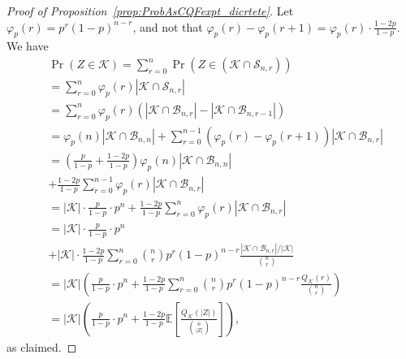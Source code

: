 \documentclass[article,doublecolumn]{IEEEtran}
\newcommand{\EE}{{\mathbb{E}}}
\newcommand{\BB}{{\mathcal{B}}}
\newcommand{\SSS}{{\mathcal{S}}}
\newcommand{\KK}{{\mathcal{K}}}
\begin{document}
\begin{proof}[Proof of Proposition~\ref{prop:ProbAsCQFexpt_dicrtete}]
Let $\varphi_p(r)=p^r(1-p)^{n-r}$, and not that $\varphi_p(r)-\varphi_{p}(r+1)=\varphi_p(r)\cdot\frac{1-2p}{1-p}$.
We have
\begin{align}
&\Pr(Z\in \KK)=\sum_{r=0}^n \Pr\left(Z\in (\KK\cap\SSS_{n,r})\right)\\
&=\sum_{r=0}^n \varphi_p(r) \left|\KK\cap\SSS_{n,r}\right|\\
&=\sum_{r=0}^n \varphi_p(r) \left(\left|\KK\cap\BB_{n,r}\right|-\left|\KK\cap\BB_{n,r-1}\right|\right)\\
&=\varphi_p(n)\left|\KK\cap\BB_{n,n}\right|+\sum_{r=0}^{n-1} (\varphi_p(r)-\varphi_p(r+1)) \left|\KK\cap\BB_{n,r}\right|\\
&=\left(\frac{p}{1-p}+\frac{1-2p}{1-p}\right)\varphi_p(n)\left|\KK\cap\BB_{n,n}\right|\nonumber\\
&+\frac{1-2p}{1-p}\sum_{r=0}^{n-1} \varphi_p(r)\left|\KK\cap\BB_{n,r}\right|\\
&=|\KK|\cdot\frac{p}{1-p}\cdot p^n+\frac{1-2p}{1-p}\sum_{r=0}^{n} \varphi_p(r)\left|\KK\cap\BB_{n,r}\right|\\
&=|\KK|\cdot\frac{p}{1-p}\cdot p^n\nonumber\\
&+|\KK|\cdot\frac{1-2p}{1-p}\sum_{r=0}^{n} {{n}\choose{r}} p^{r}(1-p)^{n-r}\frac{\left|\KK\cap\BB_{n,r}\right|/|\KK|}{{{n}\choose{r}}}\\
&=|\KK|\left(\frac{p}{1-p}\cdot p^n+ \frac{1-2p}{1-p}\sum_{r=0}^{n} {{n}\choose{r}} p^{r}(1-p)^{n-r}\frac{Q_\KK(r)}{{{n}\choose{r}}}\right)\\
&=|\KK|\left(\frac{p}{1-p}\cdot p^n+ \frac{1-2p}{1-p}\EE\left[\frac{Q_\KK(|Z|)}{{{n}\choose{|Z|}}}\right]\right),
\end{align}
as claimed.
\end{proof}
\end{document}
